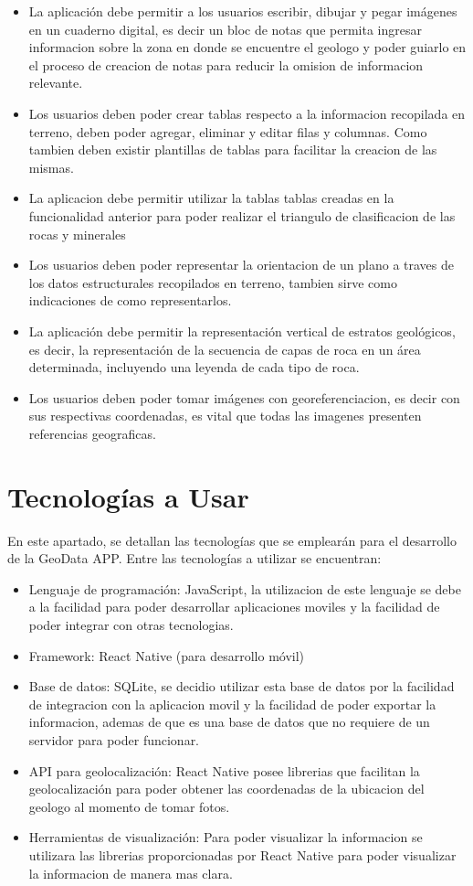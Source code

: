 \documentclass[a4paper,12pt]{article}
\begin{document}
\begin{itemize}
    \item La aplicación debe permitir a los usuarios escribir, dibujar y pegar imágenes en un cuaderno digital, es decir un bloc de notas que permita ingresar informacion sobre la zona en donde se encuentre el geologo y poder guiarlo en el proceso de creacion de notas para reducir la omision de informacion relevante.
    \item Los usuarios deben poder crear tablas respecto a la informacion recopilada en terreno, deben poder agregar, eliminar y editar filas y columnas. Como tambien deben existir plantillas de tablas para facilitar la creacion de las mismas.
    \item La aplicacion debe permitir utilizar la tablas tablas creadas en la funcionalidad anterior para poder realizar el triangulo de clasificacion de las rocas y minerales
    \item Los usuarios deben poder representar la orientacion de un plano a traves de los datos estructurales recopilados en terreno, tambien sirve como indicaciones de como representarlos.
    \item La aplicación debe permitir la representación vertical de estratos geológicos, es decir, la representación de la secuencia de capas de roca en un área determinada, incluyendo una leyenda de cada tipo de roca.
    \item Los usuarios deben poder tomar imágenes con georeferenciacion, es decir con sus respectivas coordenadas, es vital que todas las imagenes presenten referencias geograficas.
\end{itemize}

\section{Tecnologías a Usar}
En este apartado, se detallan las tecnologías que se emplearán para el desarrollo de la GeoData APP. Entre las tecnologías a utilizar se encuentran:

\begin{itemize}
    \item Lenguaje de programación: JavaScript, la utilizacion de este lenguaje se debe a la facilidad para poder desarrollar aplicaciones moviles y la facilidad de poder integrar con otras tecnologias.
    \item Framework: React Native (para desarrollo móvil)
    \item Base de datos: SQLite, se decidio utilizar esta base de datos por la facilidad de integracion con la aplicacion movil y la facilidad de poder exportar la informacion, ademas de que es una base de datos que no requiere de un servidor para poder funcionar.
    \item API para geolocalización: React Native posee librerias que facilitan la geolocalización para poder obtener las coordenadas de la ubicacion del geologo al momento de tomar fotos.
    \item Herramientas de visualización: Para poder visualizar la informacion se utilizara las librerias proporcionadas por React Native para poder visualizar la informacion de manera mas clara.
\end{itemize}
\end{document}
